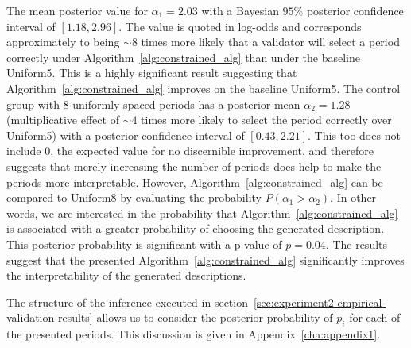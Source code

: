 The mean posterior value for $\alpha_1 = 2.03$ with a Bayesian $95\%$ posterior confidence interval of $[1.18, 2.96]$. The value is quoted in log-odds and corresponds approximately to being $\sim 8$ times more likely that a validator will select a period correctly under Algorithm~\ref{alg:constrained_alg} than under the baseline Uniform5. This is a highly significant result suggesting that Algorithm~\ref{alg:constrained_alg} improves on the baseline Uniform5. The control group with 8 uniformly spaced periods has a posterior mean $\alpha_2 = 1.28$ (multiplicative effect of $\sim 4$ times more likely to select the period correctly over Uniform5) with a posterior confidence interval of $[0.43, 2.21]$. This too does not include $0$, the expected value for no discernible improvement, and therefore suggests that merely increasing the number of periods does help to make the periods more interpretable. However, Algorithm~\ref{alg:constrained_alg} can be compared to Uniform8 by evaluating the probability $P(\alpha_1 > \alpha_2)$. In other words, we are interested in the probability that Algorithm~\ref{alg:constrained_alg} is associated with a greater probability of choosing the generated description. This posterior probability is significant with a p-value of $p = 0.04$. The results suggest that the presented Algorithm~\ref{alg:constrained_alg} significantly improves the interpretability of the generated descriptions.

The structure of the inference executed in section~\ref{sec:experiment2-empirical-validation-results} allows us to consider the posterior probability of $p_i$ for each of the presented periods. This discussion is given in Appendix~\ref{cha:appendix1}.